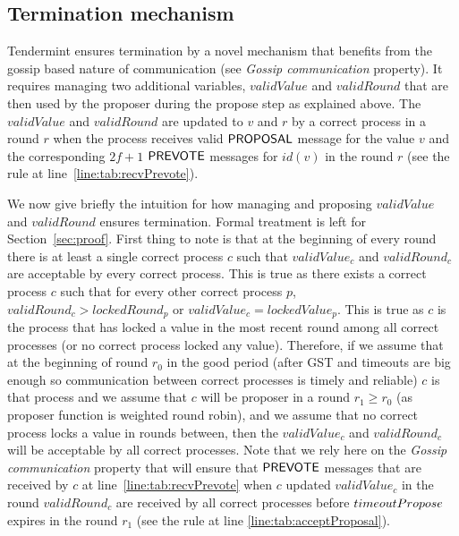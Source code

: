 \subsection{Termination mechanism}

Tendermint ensures termination by a novel mechanism that benefits from the
gossip based nature of communication (see \emph{Gossip communication}
property).  It requires managing two additional variables, $validValue$ and
$validRound$ that are then used by the proposer during the propose step as
explained above.   The $validValue$ and $validRound$ are updated to $v$ and $r$
by a correct process in a round $r$ when the process receives valid $\mathsf{PROPOSAL}$
message for the value $v$ and the corresponding $2f+1$ $\mathsf{PREVOTE}$ messages for
$id(v)$ in the round $r$ (see the rule at line~\ref{line:tab:recvPrevote}).

We now give briefly the intuition for how managing and proposing $validValue$
and $validRound$ ensures termination. Formal treatment is left for
Section~\ref{sec:proof}.  First thing to note is that at the beginning of every
round there is at least a single correct process $c$ such that $validValue_c$
and $validRound_c$ are acceptable by every correct process. This is true as
there exists a correct process $c$ such that for every other correct process
$p$, $validRound_c > lockedRound_p$ or $validValue_c = lockedValue_p$. This is
true as $c$ is the process that has locked a value in the most recent round
among all correct processes (or no correct process locked any value).
Therefore, if we assume that at the beginning of round $r_0$ in the good period
(after GST and timeouts are big enough so communication between correct
processes is timely and reliable) $c$ is that process and we assume that $c$
will be proposer in a round $r_1 \ge r_0$ (as proposer function is weighted
round robin), and we assume that no correct process locks a value in rounds
between, then the $validValue_c$ and $validRound_c$ will be acceptable by all
correct processes. Note that we rely here on the \emph{Gossip communication}
property that will ensure that $\mathsf{PREVOTE}$ messages that are received by $c$ at
line~\ref{line:tab:recvPrevote} when $c$ updated $validValue_c$ in the round
$validRound_c$ are received by all correct processes before $timeoutPropose$
expires in the round $r_1$ (see the rule at line
\ref{line:tab:acceptProposal}).   

